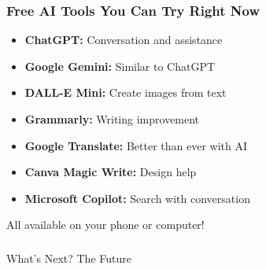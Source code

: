 \begin{frame}[fragile]\frametitle{Free AI Tools You Can Try Right Now}

\begin{itemize}
\item {\bf ChatGPT:} Conversation and assistance
\item {\bf Google Gemini:} Similar to ChatGPT
\item {\bf DALL-E Mini:} Create images from text
\item {\bf Grammarly:} Writing improvement
\item {\bf Google Translate:} Better than ever with AI
\item {\bf Canva Magic Write:} Design help
\item {\bf Microsoft Copilot:} Search with conversation
\end{itemize}

All available on your phone or computer!
\end{frame}

%
%
%

\begin{frame}[fragile]\frametitle{}
\begin{center}
{\Large What's Next? The Future}
\end{center}
\end{frame}

